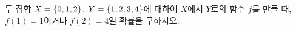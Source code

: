 두 집합 $X=\{0{,}\mkern3mu\mathopen{}1{,}\mkern3mu\mathopen{}2\}$, $Y=\{1{,}\mkern3mu\mathopen{}2{,}\mkern3mu\mathopen{}3{,}\mkern3mu\mathopen{}4\}$에 대하여 $X$에서 $Y$로의 함수 $f$를 만들 때, $f(1)=1$이거나 $f(2)=4$일 확률을 구하시오.
